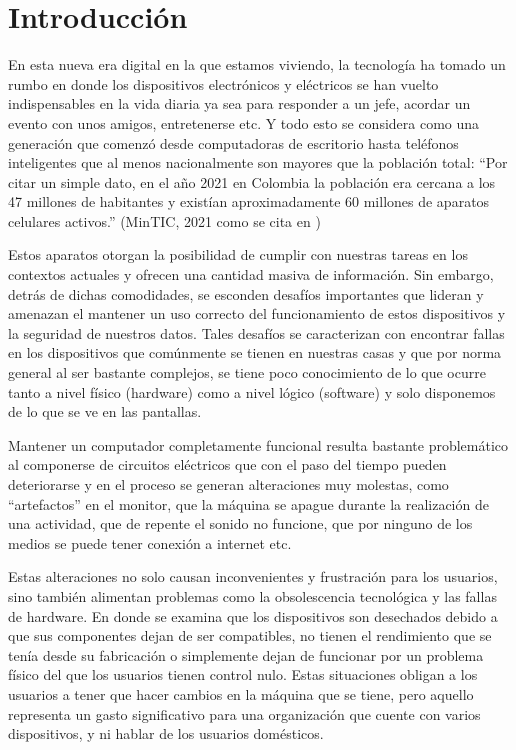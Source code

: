 \pagebreak
\section{Introducción}

En esta nueva era digital en la que estamos viviendo, la tecnología ha tomado un
rumbo en donde los dispositivos electrónicos y eléctricos se han vuelto
indispensables en la vida diaria ya sea para responder a un jefe, acordar un
evento con unos amigos, entretenerse etc. Y todo esto se considera como una
generación que comenzó desde computadoras de escritorio hasta teléfonos
inteligentes que al menos nacionalmente son mayores que la población total:
``Por citar un simple dato, en el año 2021 en Colombia la población era cercana
a los 47 millones de habitantes y existían aproximadamente 60 millones de
aparatos celulares activos.'' (MinTIC, 2021  como se cita en \cite{Trejos2023})

Estos aparatos otorgan la posibilidad de cumplir con nuestras tareas en los
contextos actuales y ofrecen una cantidad masiva de información. Sin embargo,
detrás de dichas comodidades, se esconden desafíos importantes que lideran y
amenazan el mantener un uso correcto del funcionamiento de estos dispositivos y
la seguridad de nuestros datos. Tales desafíos se caracterizan con encontrar
fallas en los dispositivos que comúnmente se tienen en nuestras casas y que por
norma general al ser bastante complejos, se tiene poco conocimiento de lo que
ocurre tanto a nivel físico (hardware) como a nivel lógico (software) y solo
disponemos de lo que se ve en las pantallas. 

Mantener un computador completamente funcional resulta bastante problemático al
componerse de circuitos eléctricos que con el paso del tiempo pueden
deteriorarse y en el proceso se generan alteraciones muy molestas, como
``artefactos'' en el monitor, que la máquina se apague durante la realización de
una actividad, que de repente el sonido no funcione, que por ninguno de los
medios se puede tener conexión a internet etc.

Estas alteraciones no solo causan inconvenientes y frustración para los
usuarios, sino también alimentan problemas como la obsolescencia tecnológica y
las fallas de hardware. En donde se examina que los dispositivos son desechados
debido a que sus componentes dejan de ser compatibles, no tienen el rendimiento
que se tenía desde su fabricación o simplemente dejan de funcionar por un
problema físico del que los usuarios tienen control nulo. Estas situaciones
obligan a los usuarios a tener que hacer cambios en la máquina que se tiene,
pero aquello representa un gasto significativo para una organización que cuente
con varios dispositivos, y ni hablar de los usuarios domésticos.

